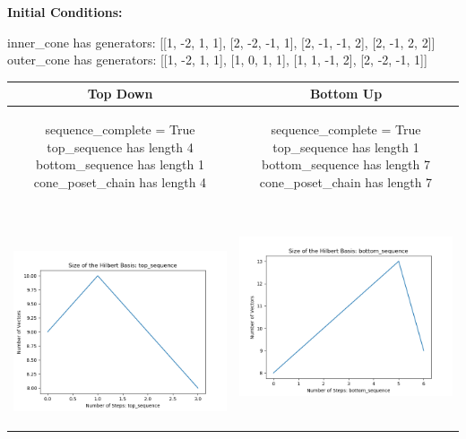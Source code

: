 \documentclass[10pt]{article}
\begin{document}
\textbf{Initial Conditions:}
\begin{SAGE}
inner_cone has generators: 
[[1, -2, 1, 1], [2, -2, -1, 1], [2, -1, -1, 2], [2, -1, 2, 2]]
outer_cone has generators: 
[[1, -2, 1, 1], [1, 0, 1, 1], [1, 1, -1, 2], [2, -2, -1, 1]]

\end{SAGE}
\begin{tabular}{c|c}
\textbf{Top Down} & \textbf{Bottom Up} \\ \hline  
\begin{SAGE}
	sequence_complete = True
	top_sequence has length 4
	bottom_sequence has length 1
	cone_poset_chain has length 4
\end{SAGE} 
&
\begin{SAGE}
	sequence_complete = True
	top_sequence has length 1
	bottom_sequence has length 7
	cone_poset_chain has length 7
\end{SAGE} 
\\ \hline
\
\begin{minipage}{.45\textwidth}
\includegraphics[width=\textwidth]{"DATA/4d/4 generators 2 bound J/top_sequence SIZE"}
\end{minipage} &
\begin{minipage}{.45\textwidth}
\includegraphics[width=\textwidth]{"DATA/4d/4 generators 2 bound J bottomup/bottom_sequence SIZE"}

\end{minipage}
\end{tabular}
\end{document}
